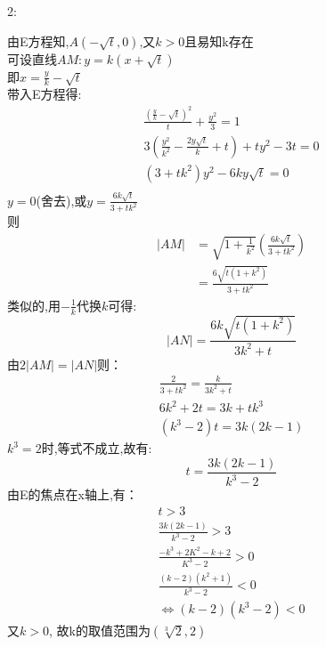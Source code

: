 \documentclass[UTF8]{ctexart}
\begin{document}
2:\par
由E方程知,$A(-\sqrt{t},0)$,又$k>0$且易知k存在\\
可设直线$AM:y=k(x+\sqrt{t})$\\
即$x=\frac{y}{k}-\sqrt{t}$\\
带入E方程得:
\[\begin{aligned}
        \frac{(\frac{y}{k}-\sqrt{t})^2}{t}+\frac{y^2}{3}=1  \\
        3(\frac{y^2}{k^2}-\frac{2y\sqrt{t}}{k}+t)+ty^2-3t=0 \\
        (3+tk^2)y^2-6ky\sqrt{t}=0                           \\
    \end{aligned}\]
$y=0$(舍去),或$y=\frac{6k\sqrt{t}}{3+tk^2}$\\
则$$\begin{aligned}
        |AM| & =\sqrt{1+\frac{1}{k^2}}(\frac{6k\sqrt{t}}{3+tk^2}) \\
             & =\frac{6\sqrt{t(1+k^2)}}{3+tk^2}
    \end{aligned}$$
类似的,用$-\frac{1}{k}$代换$k$可得:\\
\[|AN|=\frac{6k\sqrt{t(1+k^2)}}{3k^2+t} \]
由$2|AM|=|AN|$则：
\[\begin{aligned}
        \frac{2}{3+tk^2}=\frac{k}{3k^2+t} \\
        6k^2+2t=3k+tk^3                   \\
        (k^3-2)t=3k(2k-1)
    \end{aligned}  \]
$k^3=2$时,等式不成立,故有:
\[t=\frac{3k(2k-1)}{k^3-2}  \]
由E的焦点在x轴上,有：
\[\begin{aligned}
        t>3                           \\
        \frac{3k(2k-1)}{k^3-2} >3     \\
        \frac{-k^3+2K^2-k+2}{K^3-2}>0 \\
        \frac{(k-2)(k^2+1)}{k^3-2}<0  \\
        \Leftrightarrow (k-2)(k^3-2)<0
    \end{aligned}\]
又$k>0$,
故k的取值范围为$(\sqrt[3]{2},2)$
\end{document}
